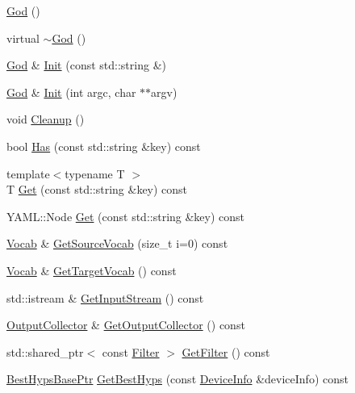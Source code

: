 \begin{DoxyCompactItemize}
\item 
\hyperlink{classamunmt_1_1God_acef51eae6aed7d1b6883b6f198cf92d4}{God} ()
\item 
virtual \hyperlink{classamunmt_1_1God_a05b83810590c957aed395391590c0cf7}{$\sim$\+God} ()
\item 
\hyperlink{classamunmt_1_1God}{God} \& \hyperlink{classamunmt_1_1God_add49c80e570f5be5b2802565458f1c36}{Init} (const std\+::string \&)
\item 
\hyperlink{classamunmt_1_1God}{God} \& \hyperlink{classamunmt_1_1God_a7a424275f1192499979b2f58ac250559}{Init} (int argc, char $\ast$$\ast$argv)
\item 
void \hyperlink{classamunmt_1_1God_a5a2cd8055526b5da47e255a7f75ea6cd}{Cleanup} ()
\item 
bool \hyperlink{classamunmt_1_1God_a5c284bd5bdde636f02dbb86af55744ae}{Has} (const std\+::string \&key) const 
\item 
{\footnotesize template$<$typename T $>$ }\\T \hyperlink{classamunmt_1_1God_ad0d3efbdf165ba0bc4de9052a826f7b6}{Get} (const std\+::string \&key) const 
\item 
Y\+A\+M\+L\+::\+Node \hyperlink{classamunmt_1_1God_acbdecb98f98edf71cc8a81493df2c56a}{Get} (const std\+::string \&key) const 
\item 
\hyperlink{classamunmt_1_1Vocab}{Vocab} \& \hyperlink{classamunmt_1_1God_a032b43755a3050ee9fb97ad27a91a63b}{Get\+Source\+Vocab} (size\+\_\+t i=0) const 
\item 
\hyperlink{classamunmt_1_1Vocab}{Vocab} \& \hyperlink{classamunmt_1_1God_aabd3caa5eb93346428948ce6639dc931}{Get\+Target\+Vocab} () const 
\item 
std\+::istream \& \hyperlink{classamunmt_1_1God_aa118cbeda9e332f518135b027aff3ac2}{Get\+Input\+Stream} () const 
\item 
\hyperlink{classamunmt_1_1OutputCollector}{Output\+Collector} \& \hyperlink{classamunmt_1_1God_ab8af5f6cc4352c053f42f4e707a281f9}{Get\+Output\+Collector} () const 
\item 
std\+::shared\+\_\+ptr$<$ const \hyperlink{classamunmt_1_1Filter}{Filter} $>$ \hyperlink{classamunmt_1_1God_a0ebdb327d0eb53de76824ba967a0b1b6}{Get\+Filter} () const 
\item 
\hyperlink{namespaceamunmt_a4a9522da34de52554ec07cedc30361b8}{Best\+Hyps\+Base\+Ptr} \hyperlink{classamunmt_1_1God_aa482b0ccfa13656701b3f03c8c869fea}{Get\+Best\+Hyps} (const \hyperlink{structamunmt_1_1DeviceInfo}{Device\+Info} \&device\+Info) const 
$$
\end{DoxyCompactItemize}
